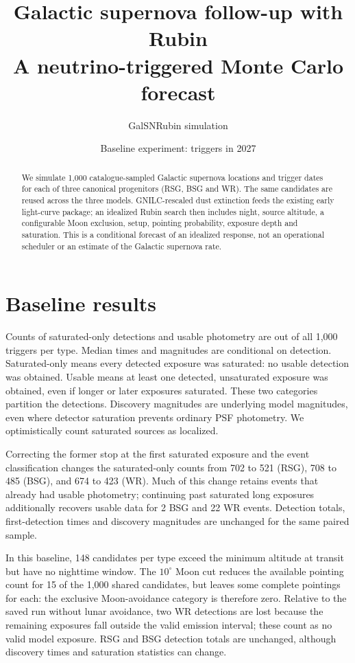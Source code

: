 \documentclass[11pt]{article}
\title{Galactic supernova follow-up with Rubin\\\large A neutrino-triggered Monte Carlo forecast}
\author{GalSNRubin simulation}
\date{Baseline experiment: triggers in 2027}
\newcommand{\runpath}{../outputs/baseline_moon}
\begin{document}
\maketitle
\begin{abstract}
We simulate 1,000 catalogue-sampled Galactic supernova locations and trigger dates
for each of three canonical progenitors (RSG, BSG and WR). The same candidates
are reused across the three models. GNILC-rescaled dust extinction feeds the
existing early light-curve package; an idealized Rubin search then includes
night, source altitude, a configurable Moon exclusion, setup, pointing
probability, exposure depth and
saturation. This is a conditional forecast of an idealized response, not an
operational scheduler or an estimate of the Galactic supernova rate.
\end{abstract}

\section{Baseline results}
\begin{center}\small\end{center}
Counts of saturated-only detections and usable photometry are out of all 1,000
triggers per type. Median times and magnitudes are conditional on detection.
Saturated-only means every detected exposure was saturated: no usable detection
was obtained. Usable means at least one detected, unsaturated exposure was
obtained, even if longer or later exposures saturated. These two categories
partition the detections. Discovery magnitudes
are underlying model magnitudes, even where detector saturation prevents
ordinary PSF photometry. We optimistically count saturated sources as localized.

Correcting the former stop at the first saturated exposure and the event classification changes
the saturated-only counts from 702 to 521 (RSG), 708 to 485 (BSG), and 674 to 423
(WR). Much of this change retains events that already had usable photometry;
continuing past saturated long exposures additionally recovers usable data for
2 BSG and 22 WR events. Detection totals, first-detection times and discovery
magnitudes are unchanged for the same paired sample.

In this baseline, 148 candidates per type exceed the minimum altitude at
transit but have no nighttime window. The $10^\circ$ Moon cut reduces the
available pointing count for 15 of the 1,000 shared candidates, but leaves
some complete pointings for each: the exclusive Moon-avoidance category is
therefore zero. Relative to the saved run without lunar avoidance, two WR
detections are lost because the remaining exposures fall outside the valid
emission interval; these count as no valid model exposure. RSG and BSG
detection totals are unchanged, although discovery times and saturation
statistics can change.
\end{document}
